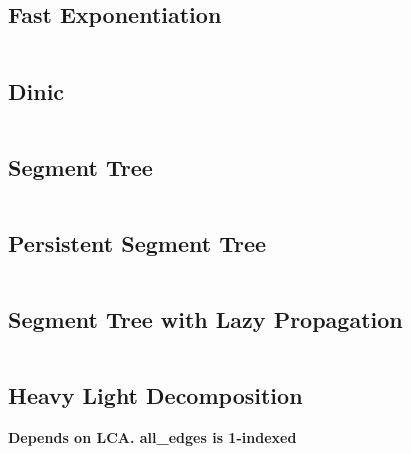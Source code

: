 \documentclass{article}
\begin{document}
\subsection{Fast Exponentiation}
\inputminted[obeytabs=true,tabsize=4]{cpp}{code/fast_exp.cpp}
\subsection{Dinic}
\inputminted[obeytabs=true,tabsize=4]{cpp}{code/dinic.cpp}
\subsection{Segment Tree} 
\inputminted[obeytabs=true,tabsize=4]{cpp}{code/seg.cpp}
\subsection{Persistent Segment Tree} 
\inputminted[obeytabs=true,tabsize=4]{cpp}{code/persistentseg.cpp}
\subsection{Segment Tree with Lazy Propagation} 
\inputminted[obeytabs=true,tabsize=4]{cpp}{code/lazyseg.cpp}
\subsection{Heavy Light Decomposition} 
\textbf{Depends on LCA. all\_edges is 1-indexed}
\inputminted[obeytabs=true,tabsize=4]{cpp}{code/hlp.cpp}
\end{document}
